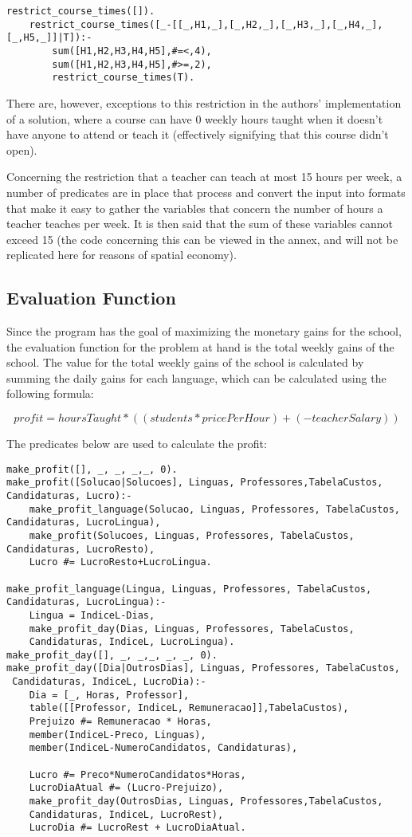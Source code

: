 \documentclass{llncs}
\begin{document}
\begin{verbatim}
restrict_course_times([]).
	restrict_course_times([_-[[_,H1,_],[_,H2,_],[_,H3,_],[_,H4,_],[_,H5,_]]|T]):-
		sum([H1,H2,H3,H4,H5],#=<,4),
		sum([H1,H2,H3,H4,H5],#>=,2),
		restrict_course_times(T).
\end{verbatim}

There are, however, exceptions to this restriction in the authors' implementation of a solution, where a course can have 0 weekly hours taught when it doesn't have anyone to attend or teach it (effectively signifying that this course didn't open).

Concerning the restriction that a teacher can teach at most 15 hours per week, a number of predicates are in place that process and convert the input into formats that make it easy to gather the variables that concern the number of hours a teacher teaches per week. It is then said that the sum of these variables cannot exceed 15 (the code concerning this can be viewed in the annex, and will not be replicated here for reasons of spatial economy).

\subsection{Evaluation Function}
Since the program has the goal of maximizing the monetary gains for the school, the evaluation function for the problem at hand is the total weekly gains of the school. The value for the total weekly gains of the school is calculated by summing the daily gains for each language, which can be calculated using the following formula:

\begin{equation}
	profit = hoursTaught*((students*pricePerHour)+(-teacherSalary))
\end{equation}

The predicates below are used to calculate the profit:
\begin{verbatim}
make_profit([], _, _, _,_, 0).
make_profit([Solucao|Solucoes], Linguas, Professores,TabelaCustos, Candidaturas, Lucro):-
	make_profit_language(Solucao, Linguas, Professores, TabelaCustos, Candidaturas, LucroLingua),
	make_profit(Solucoes, Linguas, Professores, TabelaCustos, Candidaturas, LucroResto),
	Lucro #= LucroResto+LucroLingua.

make_profit_language(Lingua, Linguas, Professores, TabelaCustos, 
Candidaturas, LucroLingua):-
	Lingua = IndiceL-Dias,
	make_profit_day(Dias, Linguas, Professores, TabelaCustos, 
	Candidaturas, IndiceL, LucroLingua).
make_profit_day([], _, _,_, _, _, 0).
make_profit_day([Dia|OutrosDias], Linguas, Professores, TabelaCustos,
 Candidaturas, IndiceL, LucroDia):-
	Dia = [_, Horas, Professor],
	table([[Professor, IndiceL, Remuneracao]],TabelaCustos),
	Prejuizo #= Remuneracao * Horas,
	member(IndiceL-Preco, Linguas),
	member(IndiceL-NumeroCandidatos, Candidaturas),

	Lucro #= Preco*NumeroCandidatos*Horas,
	LucroDiaAtual #= (Lucro-Prejuizo),
	make_profit_day(OutrosDias, Linguas, Professores,TabelaCustos, 
	Candidaturas, IndiceL, LucroRest),
	LucroDia #= LucroRest + LucroDiaAtual.
\end{verbatim}
\end{document}
